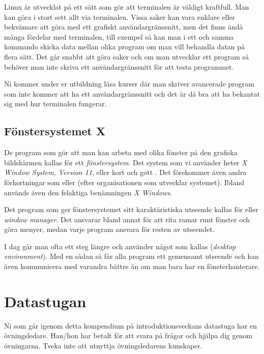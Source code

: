 \documentclass[a4paper,twocolumn]{book}
\begin{document}
Linux är utvecklat på ett sätt som gör att terminalen är väldigt kraftfull.
Man kan göra i stort sett allt via terminalen. Vissa saker kan vara enklare 
eller bekvämare att göra med ett grafiskt användargränssnitt, men det finns ändå
många fördelar med terminalen, till exempel så kan man i ett och samma kommando skicka data
mellan olika program om man vill behandla datan på flera sätt. Det går snabbt att
göra saker och om man utvecklar ett program så behöver man inte skriva ett 
användargränssnitt för att testa programmet.

Ni kommer under er utbildning läsa kurser där man skriver avancerade program som
inte kommer att ha ett användargränssnitt och det är då bra att ha bekantat sig
med hur terminalen fungerar.

\subsection{Fönstersystemet X}

De program som gör att man kan arbeta med olika fönster på den
grafiska bildskärmen kallas för ett \emph{fönstersystem}. Det system
som vi använder heter \emph{X Window System, Version 11},
eller kort och gott . Det förekommer även andra
förkortningar som  eller  (efter organisationen
som utvecklar systemet). Ibland används
även den felaktiga benämningen \emph{X Windows}.

Det program som ger fönstersystemet sitt karaktäristiska utseende
kallas för  eller \emph{window manager}. Det
ansvarar bland annat för att rita ramar runt fönster och göra menyer, medan
varje program ansvara för resten av utseendet.

I dag går man ofta ett steg längre och använder något som kallas
 (\emph{desktop environment}). Med en sådan så får
alla program ett gemensamt utseende och kan även kommunicera med varandra
bättre än om man bara har en fönsterhanterare.

\section{Datastugan}

Ni som går igenom detta kompendium på introduktionsveckans datastuga
har en övningsledare. Han/hon har betalt för att svara på frågor och
hjälpa dig genom övningarna. Tveka inte att utnyttja övningsledarens
kunskaper. 
\end{document}
